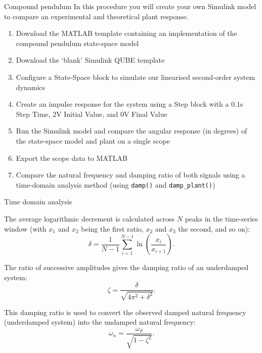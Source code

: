 \documentclass[9pt]{beamer-control}
\begin{document}
\begin{frame}{Compound pendulum}
In this procedure you will create your own Simulink model to compare an experimental and theoretical plant response.
\begin{enumerate}
	\item Download the MATLAB template containing an implementation of the compound pendulum state-space model
    \item Download the `blank' Simulink QUBE template
    \item Configure a State-Space block to simulate our linearised second-order system dynamics
    \item Create an impulse response for the system using a Step block with a $0.1$s Step Time, $2$V Initial Value, and $0$V Final Value
    \item Run the Simulink model and compare the angular response (in degrees) of the state-space model and plant on a single scope 
    \item Export the scope data to MATLAB
    \item Compare the natural frequency and damping ratio of both signals using a time-domain analysis method (using \texttt{damp()} and \texttt{damp\_plant()})
\end{enumerate}

\end{frame}

\begin{frame}{Time domain analysis}

The average logarithmic decrement is calculated across \(N\) peaks in the
time-series window (with \(x_1\) and \(x_2\) being the first ratio,
\(x_2\) and \(x_3\) the second, and so on):
%
\begin{equation}
	\delta
	=
	\frac{1}{N-1}
	\sum_{i=1}^{N-1}
	\ln\left(\frac{x_i}{x_{i+1}}\right).
\end{equation}

The ratio of successive amplitudes gives the damping ratio of an
underdamped system:
%
\begin{equation}
	\zeta
	=
	\frac{\delta}
	{\sqrt{4\pi^2+\delta^2}}.
\end{equation}

This damping ratio is used to convert the observed damped natural frequency (underdamped system)
into the undamped natural frequency:
%
\begin{equation}
	\omega_n
	=
	\frac{\omega_d}{\sqrt{1-\zeta^2}}.
\end{equation}

\end{frame}
\end{document}

